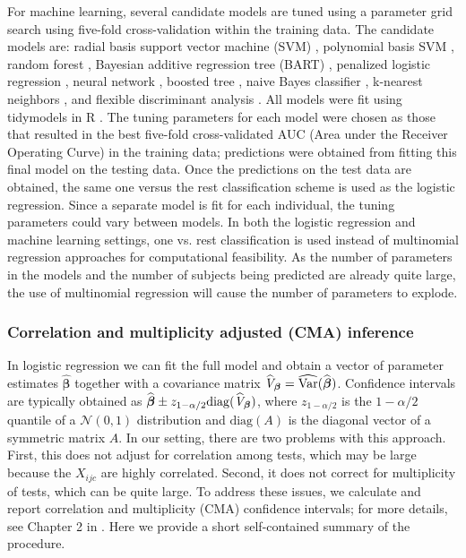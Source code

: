For machine learning, several candidate models are tuned using a parameter grid search using five-fold cross-validation within the training data. The candidate models are: radial basis support vector machine (SVM) \cite{karatzoglou_kernlab_2004}, polynomial basis SVM \cite{karatzoglou_kernlab_2004}, random forest \cite{kuhn_applied_2013}, Bayesian additive regression tree (BART) \cite{chipman_bart_2010}, penalized logistic regression \cite{kuhn_applied_2013}, neural network \cite{kuhn_applied_2013}, boosted tree \cite{chen_xgboost_2016}, naive Bayes classifier \cite{kuhn_applied_2013}, k-nearest neighbors \cite{hechenbichler_weighted_2004}, and flexible discriminant analysis \cite{hastie_flexible_1994}. All models were fit using tidymodels in R \cite{kuhn_tidy_2023, R, tidymodels}. The tuning parameters for each model were chosen as those that resulted in the best five-fold cross-validated AUC (Area under the Receiver Operating Curve) in the training data; predictions were obtained from fitting this final model on the testing data. Once the predictions on the test data are obtained, the same one versus the rest classification scheme is used as the logistic regression. Since a separate model is fit for each individual, the tuning parameters could vary between models. In both the logistic regression and machine learning settings, one vs. rest classification is used instead of multinomial regression approaches for computational feasibility. As the number of parameters in the models and the number of subjects being predicted are already quite large, the use of multinomial regression will cause the number of parameters to explode.


\subsubsection{Correlation and multiplicity adjusted (CMA) inference}\label{sec:CMA_inference} 
In logistic regression we can fit the full model and obtain a vector of parameter estimates $\widehat{\boldsymbol{\beta}}$ together with a covariance matrix $\widehat{\mathit{V}}_{\boldsymbol{\beta}}=\widehat{\rm Var}(\widehat{\boldsymbol{\beta}})$. Confidence intervals are typically obtained as
$\widehat{\boldsymbol{\beta}}\pm z_{1-\alpha/2}{\rm diag}(\widehat{\mathit{V}}_{\boldsymbol{\beta}})$,
where $z_{1-\alpha/2}$ is the $1-\alpha/2$ quantile of a $\mathcal{N}(0,1)$ distribution and $\text{diag}(\mathit{A})$ is the diagonal vector of a symmetric matrix $\mathit{A}$. In our setting, there are two problems with this approach. First, this does not adjust for correlation among tests, which may be large because the $X_{ijc}$ are highly correlated. Second, it does not correct for multiplicity of tests, which can be quite large. To address these issues, we calculate and report correlation and multiplicity (CMA) confidence intervals; for more details, see Chapter 2 in \cite{crainiceanu2023book}. Here we provide a short self-contained summary of the procedure. 


